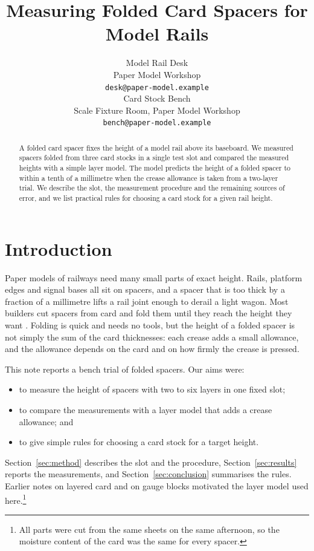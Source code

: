 \documentclass{article}
\title{Measuring Folded Card Spacers for Model Rails}
\author{Model Rail Desk \\
Paper Model Workshop \\
\texttt{desk@paper-model.example} \\
\And
Card Stock Bench \\
Scale Fixture Room, Paper Model Workshop \\
\texttt{bench@paper-model.example}
}
\begin{document}
\maketitle

\begin{abstract}
A folded card spacer fixes the height of a model rail above its baseboard.
We measured spacers folded from three card stocks in a single test slot and
compared the measured heights with a simple layer model. The model predicts the
height of a folded spacer to within a tenth of a millimetre when the crease
allowance is taken from a two-layer trial. We describe the slot, the measurement
procedure and the remaining sources of error, and we list practical rules for
choosing a card stock for a given rail height.
\end{abstract}

\section{Introduction}\label{sec:intro}
Paper models of railways need many small parts of exact height. Rails,
platform edges and signal bases all sit on spacers, and a spacer that is too
thick by a fraction of a millimetre lifts a rail joint enough to derail a light
wagon. Most builders cut spacers from card and fold them until they reach the
height they want \citep{desk25}. Folding is quick and needs no tools, but the
height of a folded spacer is not simply the sum of the card thicknesses: each
crease adds a small allowance, and the allowance depends on the card and on how
firmly the crease is pressed.

This note reports a bench trial of folded spacers. Our aims were:
\begin{itemize}
\item to measure the height of spacers with two to six layers in one fixed slot;
\item to compare the measurements with a layer model that adds a crease allowance; and
\item to give simple rules for choosing a card stock for a target height.
\end{itemize}
Section~\ref{sec:method} describes the slot and the procedure, Section~\ref{sec:results}
reports the measurements, and Section~\ref{sec:conclusion} summarises the rules.
Earlier notes on layered card \citep{bench24} and on gauge blocks
\citep{scale23} motivated the layer model used here.\footnote{All parts were
cut from the same sheets on the same afternoon, so the moisture content of the
card was the same for every spacer.}
\end{document}
